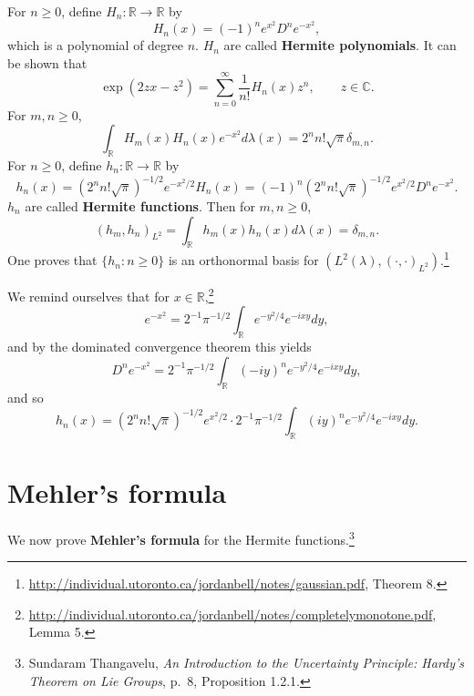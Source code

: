 \documentclass{article}
\theoremstyle{definition}
\theoremstyle{definition}
\begin{document}
For $n \geq 0$, define $H_n:\mathbb{R} \to \mathbb{R}$ by
\[
H_n(x) = (-1)^n e^{x^2} D^n e^{-x^2},
\]
which is a polynomial of degree $n$. $H_n$ are called \textbf{Hermite
polynomials}.
It can be shown that
\begin{equation}
\exp(2zx-z^2)=\sum_{n=0}^\infty \frac{1}{n!} H_n(x) z^n,\qquad z \in \mathbb{C}.
\label{generating}
\end{equation}
For $m, n \geq 0$,
\[
\int_{\mathbb{R}} H_m(x) H_n(x) e^{-x^2} d\lambda(x) =2^n n! \sqrt{\pi}   \delta_{m,n}.
\]
For $n \geq 0$, define  $h_n:\mathbb{R} \to \mathbb{R}$ by
\[
h_n(x) = 
(2^n n! \sqrt{\pi})^{-1/2} e^{-x^2/2}H_n(x)=
(-1)^n (2^n n! \sqrt{\pi})^{-1/2} e^{x^2/2} D^n e^{-x^2}.
\]
$h_n$ are called \textbf{Hermite functions}.
Then for $m,n \geq 0$,
\[
(h_m,h_n)_{L^2} = \int_{\mathbb{R}} h_m(x) h_n(x) d\lambda(x) = \delta_{m,n}.
\]
One proves that $\{h_n: n \geq 0\}$ is an orthonormal basis for $(L^2(\lambda),(\cdot,\cdot)_{L^2})$.\footnote{\url{http://individual.utoronto.ca/jordanbell/notes/gaussian.pdf},
Theorem 8.}


We remind ourselves that for $x \in \mathbb{R}$,\footnote{\url{http://individual.utoronto.ca/jordanbell/notes/completelymonotone.pdf},
Lemma 5.}
\[
e^{-x^2} = 2^{-1} \pi^{-1/2} \int_{\mathbb{R}} e^{-y^2/4} e^{-i xy} dy,
\]
and by the dominated convergence theorem this yields
\[
D^n e^{-x^2} = 2^{-1} \pi^{-1/2} \int_{\mathbb{R}} (-iy)^n e^{-y^2/4} e^{-ixy} dy,
\]
and so
\begin{equation}
h_n(x) = (2^n n! \sqrt{\pi})^{-1/2} e^{x^2/2} \cdot  2^{-1} \pi^{-1/2}  \int_{\mathbb{R}} (iy)^n e^{-y^2/4} e^{-ixy} dy.
\label{gaussian}
\end{equation}


\section{Mehler's formula}
We now prove \textbf{Mehler's formula} for the Hermite functions.\footnote{Sundaram Thangavelu,
{\em An Introduction to the
Uncertainty Principle: Hardy's Theorem on Lie Groups}, p.~8, Proposition 1.2.1.}
\end{document}
